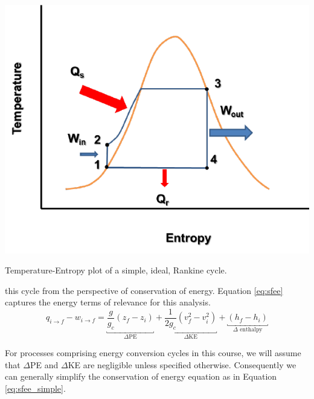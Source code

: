 \documentclass{tufte-book}
\begin{document}
\begin{marginfigure}
\includegraphics{simple_ideal_rankine_TS.pdf}
\caption{Temperature-Entropy plot of a simple, ideal, Rankine cycle.}
\label{fig:simple_rankine_TS}
\end{marginfigure}

 this cycle from the perspective of conservation of energy.  Equation \ref{eq:sfee} captures the energy terms of relevance for this analysis.
\begin{equation}
q_{i \rightarrow f} - w_{i \rightarrow f}=\underbracket{\frac{g}{g_c}\left(z_f - z_i \right)}_{\Delta \text{PE}} + \underbracket{\frac{1}{2g_c}\left(v_f^2 - v_i^2\right)}_{\Delta \text{KE}} + \underbracket{\left(h_f - h_i\right)}_{\Delta \text{ enthalpy}}
\label{eq:sfee}
\end{equation}

For processes comprising energy conversion cycles in this course, we will assume that $\Delta$PE and $\Delta$KE are negligible unless specified otherwise.  Consequently we can generally simplify the conservation of energy equation as in Equation \ref{eq:sfee_simple}.
\end{document}

